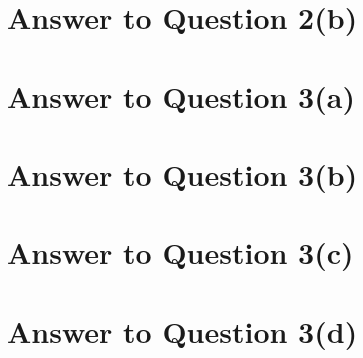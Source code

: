 \documentclass[11pt]{article}
\begin{document}
\pagebreak[4]
\section*{Answer to Question 2(b)}

\pagebreak[4]
\section*{Answer to Question 3(a)}

\pagebreak[4]
\section*{Answer to Question 3(b)}

\pagebreak[4]
\section*{Answer to Question 3(c)}

\pagebreak[4]
\section*{Answer to Question 3(d)}
\end{document}
